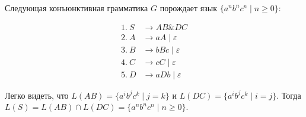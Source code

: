 \begin{example}
    Следующая конъюнктивная грамматика $G$ порождает язык $\{a^nb^nc^n\mid n \geq 0\}$:
    
    \begin{align*}
    1.\ S   &\to A B \& D C \\
    2.\ A  &\to a A \mid \varepsilon \\ 
    3.\ B &\to b B c \mid \varepsilon \\
    4.\ C   &\to c C \mid \varepsilon \\ 
    5.\ D   &\to aDb \mid \varepsilon
    \end{align*}
    
    Легко видеть, что $L(AB) = \{a^ib^jc^k\mid j = k\}$ и $L(DC) = \{a^ib^jc^k\mid i = j\}$. Тогда $L(S) = L(AB) \cap L(DC) = \{a^nb^nc^n\mid n \geq 0\}$. 
    

\end{example}
